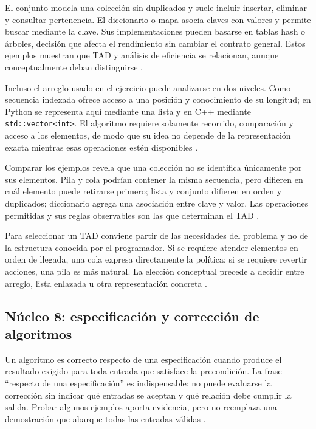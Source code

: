 \documentclass[12pt,letterpaper]{article}
\newcommand{\codigo}[1]{\texttt{#1}}
\begin{document}
El conjunto modela una colección sin duplicados y suele incluir insertar, eliminar y consultar pertenencia. El diccionario o mapa asocia claves con valores y permite buscar mediante la clave. Sus implementaciones pueden basarse en tablas hash o árboles, decisión que afecta el rendimiento sin cambiar el contrato general. Estos ejemplos muestran que TAD y análisis de eficiencia se relacionan, aunque conceptualmente deban distinguirse \citep{cormen2022,sedgewick2011,skiena2020}.

Incluso el arreglo usado en el ejercicio puede analizarse en dos niveles. Como secuencia indexada ofrece acceso a una posición y conocimiento de su longitud; en Python se representa aquí mediante una lista y en C++ mediante \codigo{std::vector<int>}. El algoritmo requiere solamente recorrido, comparación y acceso a los elementos, de modo que su idea no depende de la representación exacta mientras esas operaciones estén disponibles \citep{goodrichpy2013,goodrichcpp2011,python2026}.

Comparar los ejemplos revela que una colección no se identifica únicamente por sus elementos. Pila y cola podrían contener la misma secuencia, pero difieren en cuál elemento puede retirarse primero; lista y conjunto difieren en orden y duplicados; diccionario agrega una asociación entre clave y valor. Las operaciones permitidas y sus reglas observables son las que determinan el TAD \citep{sedgewick2011,goodrichpy2013,wirth1976}.

Para seleccionar un TAD conviene partir de las necesidades del problema y no de la estructura conocida por el programador. Si se requiere atender elementos en orden de llegada, una cola expresa directamente la política; si se requiere revertir acciones, una pila es más natural. La elección conceptual precede a decidir entre arreglo, lista enlazada u otra representación concreta \citep{skiena2020,aho1974,goodrichcpp2011}.

\subsection{Núcleo 8: especificación y corrección de algoritmos}

Un algoritmo es correcto respecto de una especificación cuando produce el resultado exigido para toda entrada que satisface la precondición. La frase ``respecto de una especificación'' es indispensable: no puede evaluarse la corrección sin indicar qué entradas se aceptan y qué relación debe cumplir la salida. Probar algunos ejemplos aporta evidencia, pero no reemplaza una demostración que abarque todas las entradas válidas \citep{hoare1969,cormen2022,zanabria2026}.
\end{document}
